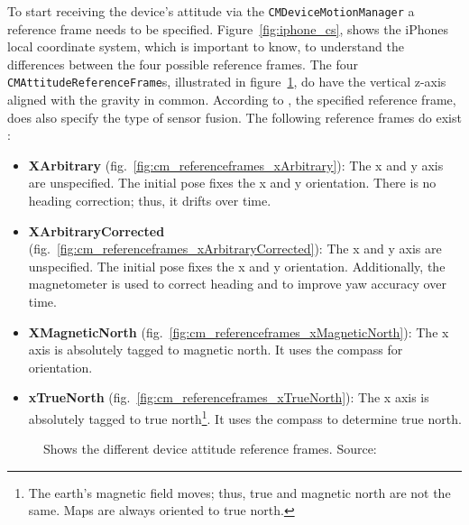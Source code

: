 To start receiving the device's attitude via the \texttt{CMDeviceMotionManager} a reference frame needs to be specified. Figure~\ref{fig:iphone_cs}, shows the iPhones local coordinate system, which is important to know, to understand the differences between the four possible reference frames. The four \texttt{CMAttitudeReferenceFrame}s, illustrated in figure~\ref{fig:cm_referenceframes}, do have the vertical z-axis aligned with the gravity in common. According to \citet{apple:wwdc_2014_pham}, the specified reference frame, does also specify the type of sensor fusion. The following reference frames do exist \citep{apple:wwdc_2014_pham,apple:ios_doc_cm}:
\begin{itemize}
  \item \textbf{XArbitrary} (fig.~\ref{fig:cm_referenceframes_xArbitrary}): The x and y axis are unspecified. The initial pose fixes the x and y orientation. There is no heading correction; thus, it drifts over time.
  \item \textbf{XArbitraryCorrected} (fig.~\ref{fig:cm_referenceframes_xArbitraryCorrected}): The x and y axis are unspecified. The initial pose fixes the x and y orientation. Additionally, the magnetometer is used to correct heading and to improve yaw accuracy over time.
  \item \textbf{XMagneticNorth} (fig.~\ref{fig:cm_referenceframes_xMagneticNorth}): The x axis is absolutely tagged to magnetic north. It uses the compass for orientation.
  \item \textbf{xTrueNorth} (fig.~\ref{fig:cm_referenceframes_xTrueNorth}): The x axis is absolutely tagged to true north\footnote{The earth's magnetic field moves; thus, true and magnetic north are not the same. Maps are always oriented to true north.}. It uses the compass to determine true north.
\end{itemize}

\begin{figure}
      
	\caption{Shows the different device attitude reference frames. Source:~ \citep{apple:wwdc_2012_pham}}
	\label{fig:cm_referenceframes}
\end{figure}


